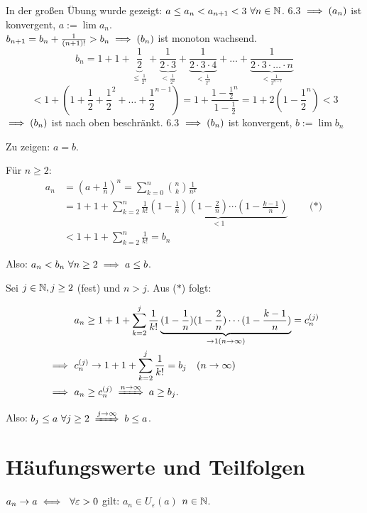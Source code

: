 \documentclass[a4paper,twoside,DIV15,BCOR12mm]{scrbook}
\begin{document}
\begin{beweis}
In der großen Übung wurde gezeigt: $a\le a_n < a_{n+1} < 3\ \forall n\in\mathbb{N}$. 6.3 $\implies(a_n)$ ist konvergent, $a:=\lim a_n$.\\
$b_{n+1} = b_n + \frac{1}{(n+1)!} > b_n \implies (b_n)$ ist monoton wachsend.
$$b_n = 1+ 1+ \underbrace{\frac{1}{2}}_{\le\frac{1}{2^1}} + \underbrace{\frac{1}{2\cdot3}}_{<\frac{1}{2^2}} + \underbrace {\frac{1}{2\cdot 3\cdot 4}}_{< \frac{1}{2^3}}+\ldots+ \underbrace{\frac{1}{2\cdot3\cdot\ldots\cdot n}}_{< \frac{1}{2^{n-1}}} $$
$$ < 1+ (1+ \frac{1}{2} + \frac{1}{2}^2 + \ldots + \frac{1}{2}^{n-1}) = 1+ \frac{1-\frac{1}{2}^n}{1-\frac{1}{2}} = 1+ 2(1-\frac{1}{2}^n) < 3$$
$\implies (b_n)$ ist nach oben beschränkt. 6.3 $\implies (b_n)$ ist konvergent, $b:=\lim b_n$

Zu zeigen: $a=b$.

Für $n\ge2$:
\begin{align*}
a_n&=(a+\frac{1}{n})^n=\sum_{k=0}^n{\binom{n}{k}\frac{1}{n^k}} \\
&=1+1+\sum_{k=2}^{n}{\frac{1}{k!}\underbrace{(1-\frac{1}{n})(1-\frac{2}{n})\cdots(1-\frac{k-1}{n})}_{<1}}\qquad\text{($*$)} \\
&<1+1+\sum_{k=2}^n{\frac{1}{k!}}=b_n
\end{align*}

Also: $a_n<b_n\ \forall n\ge2 \implies a\le b$.

Sei $j\in\mathbb{N}, j\ge 2$ (fest) und $n>j$. Aus ($*$) folgt:


\begin{align*}
& a_n\ge 1+1+\sum_{k=2}^{j}{\frac{1}{k!}\underbrace{(1-\frac{1}{n})(1-\frac{2}{n})\cdots(1-\frac{k-1}{n})}_{\rightarrow 1(n \rightarrow \infty)}} = c_n^{(j)} \\
\folgt\ & c_n^{(j)} \rightarrow 1+1+\sum_{k=2}^j{\frac{1}{k!}}=b_j\quad(n \rightarrow \infty) \\
\folgt\ & a_n\ge c_n^{(j)} \folgtwegen{n \rightarrow \infty} a\ge b_j\text{.} \\
\end{align*}

Also: $b_j\le a\ \forall j\ge 2 \folgtwegen{j \rightarrow \infty} b\le a$.
\end{beweis}

\chapter{Häufungswerte und Teilfolgen}

\begin{erinnerung}
$a_n \to a \iff\ \forall \varepsilon > 0$ gilt: $a_n \in  U_\varepsilon(a)$ \ffa $n \in\mathbb{N}$.
\end{erinnerung}
\end{document}
